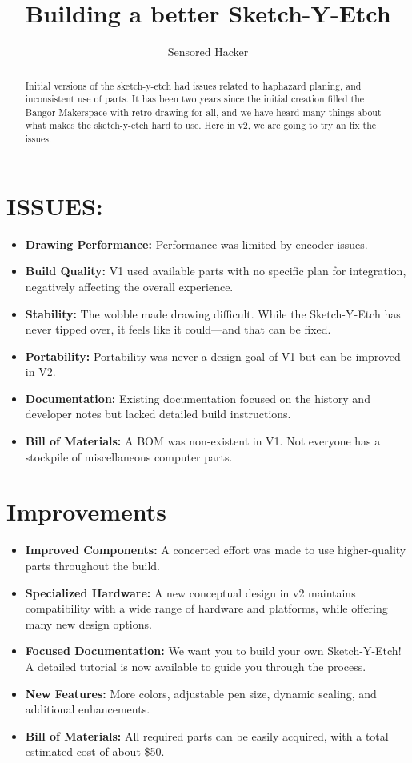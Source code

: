 \documentclass[]{article}
\title{Building a better Sketch-Y-Etch}
\author{Sensored Hacker}
\begin{document}
\maketitle

\begin{abstract}
Initial versions of the sketch-y-etch had issues related to haphazard planing, and inconsistent use of parts. It has been two years since the initial creation filled the Bangor Makerspace with retro drawing for all, and we have heard many things about 
what makes the sketch-y-etch hard to use. Here in v2, we are going to try an fix the issues. 
\end{abstract}

\section*{ISSUES:}
\begin{itemize}
	\item \textbf{Drawing Performance:} Performance was limited by encoder issues.
	\item \textbf{Build Quality:} V1 used available parts with no specific plan for integration, negatively affecting the overall experience.
	\item \textbf{Stability:} The wobble made drawing difficult. While the Sketch-Y-Etch has never tipped over, it feels like it could—and that can be fixed.
	\item \textbf{Portability:} Portability was never a design goal of V1 but can be improved in V2.
	\item \textbf{Documentation:} Existing documentation focused on the history and developer notes but lacked detailed build instructions.
	\item \textbf{Bill of Materials:} A BOM was non-existent in V1. Not everyone has a stockpile of miscellaneous computer parts.
\end{itemize}

\section*{Improvements}

\begin{itemize}
	\item \textbf{Improved Components:} A concerted effort was made to use higher-quality parts throughout the build.
	\item \textbf{Specialized Hardware:} A new conceptual design in v2 maintains compatibility with a wide range of hardware and platforms, while offering many new design options.
	\item \textbf{Focused Documentation:} We want you to build your own Sketch-Y-Etch! A detailed tutorial is now available to guide you through the process.
	\item \textbf{New Features:} More colors, adjustable pen size, dynamic scaling, and additional enhancements.
	\item \textbf{Bill of Materials:} All required parts can be easily acquired, with a total estimated cost of about \$50.
\end{itemize}
\end{document}
